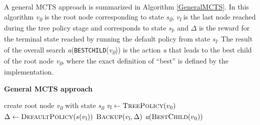 \medskip\noindent
A general MCTS approach is summarized in Algorithm \ref{GeneralMCTS}. In this algorithm \textit{v\textsubscript{0}} is the root node corresponding to state \textit{s\textsubscript{0}}, \textit{v\textsubscript{l}} is the last node reached during the tree policy stage and corresponds to state \textit{s\textsubscript{l}}, and $\Delta$ is the reward for the terminal state reached by running the default policy from state \textit{s\textsubscript{l}}. The result of the overall search \textit{a}(\texttt{BESTCHILD}(\textit{v\textsubscript{0}})) is the action \textit{a} that leads to the best child of the root node \textit{v\textsubscript{0}}, where the exact definition of “best” is defined by the implementation.

\begin{algorithm}
  \caption[General MCTS approach]{\textbf{General MCTS approach}}\label{GeneralMCTS}
  \begin{algorithmic}
    \State create root node \textit{v\textsubscript{0}} with state \textit{s\textsubscript{0}}
        \State $\textit{v\textsubscript{l}}\gets \Call{TreePolicy}{v\textsubscript{0}}$
        \State $\Delta\gets \Call{DefaultPolicy}{s(v\textsubscript{l}})$
        \State $\Call{Backup}{v\textsubscript{l}, \Delta}$
    \EndWhile
    \State \Return $\textit{a}(\Call{BestChild}{v\textsubscript{0}})$
    \EndFunction
  \end{algorithmic}
\end{algorithm}

